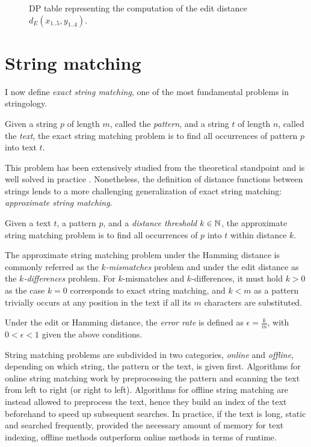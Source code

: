 \begin{figure}[h]
\begin{center}
\caption[Example of DP table]{DP table representing the computation of the edit distance $d_E(x_{1..5}, y_{1..4})$.}
\label{fig:edit-dp}

\end{center}
\end{figure}



\section{String matching}

I now define \emph{exact string matching}, one of the most fundamental problems in stringology.
\begin{definition}
\citep{Gusfield1997}
Given a string $p$ of length $m$, called the \emph{pattern}, and a string $t$ of length $n$, called the \emph{text}, the exact string matching problem is to find all occurrences of pattern $p$ into text $t$.
\end{definition}

This problem has been extensively studied from the theoretical standpoint and is well solved in practice \citep{Faro2013}.
Nonetheless, the definition of distance functions between strings lends to a more challenging generalization of exact string matching: \emph{approximate string matching}.

\begin{definition}
\citep{Galil1988}
Given a text $t$, a pattern $p$, and a \emph{distance threshold} $k \in \mathbb {N}$, the approximate string matching problem is to find all occurrences of $p$ into $t$ within distance $k$.
\end{definition}
The approximate string matching problem under the Hamming distance is commonly referred as the \emph{$k$-mismatches} problem and under the edit distance as the \emph{$k$-differences} problem.
For $k$-mismatches and $k$-differences, it must hold $k > 0$ as the case $k = 0$ corresponds to exact string matching, and $k < m$ as a pattern trivially occurs at any position in the text if all its $m$ characters are substituted.
\begin{definition}
Under the edit or Hamming distance, the \emph{error rate} is defined as $\epsilon = \frac{k}{m}$, with $0 < \epsilon < 1$ given the above conditions.
\end{definition}

String matching problems are subdivided in two categories, \emph{online} and \emph{offline}, depending on which string, the pattern or the text, is given first.
Algorithms for online string matching work by preprocessing the pattern and scanning the text from left to right (or right to left).
Algorithms for offline string matching are instead allowed to preprocess the text,
hence they build an index of the text beforehand to speed up subsequent searches.
In practice, if the text is long, static and searched frequently, provided the necessary amount of memory for text indexing, offline methods outperform online methods in terms of runtime.

